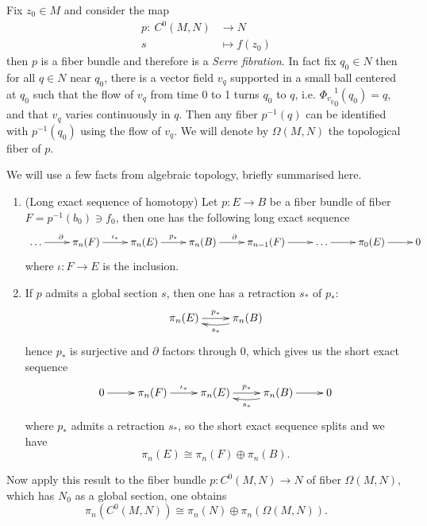 Fix \(z_0\in M\) and consider the map 
\begin{align*}
  p: \ C^0(M,N) &\longrightarrow N\\
       s	&\longmapsto	 f(z_0)
\end{align*}
then \(p\) is a fiber bundle and therefore is a \emph{Serre fibration}. In fact fix \(q_0\in N\) then for all \(q\in N\) near \(q_0\), there is a vector field \(v_q\) supported
in a small ball centered at \(q_0\) such that the flow of \(v_q\) from time 0 to 1
turns \(q_0\) to \(q\), i.e. \({\Phi_{v_q}}_0^1(q_0)=q\), and that \(v_q\) varies continuously
in \(q\). Then any fiber \(p^{-1}(q)\) can be identified with \(p^{-1}(q_0)\) using
the flow of \(v_q\). We will denote by \(\Omega(M,N)\) the topological fiber of \(p\).


We will use a few facts from algebraic topology, briefly summarised here.

\begin{fact}
\label{fact:alg-top-Omega-M-N}
\begin{enumerate}
\item (Long exact sequence of homotopy) Let \(p: E \longrightarrow B\) be a fiber bundle
of fiber \(F = p^{-1}(b_0) \ni f_0\), then one has the following long exact sequence
\[
    \xymatrix{
    \dots \ar@{->}[r]^{\partial} & \pi_n(F) \ar@{->}[r]^{\iota_*} & \pi_n(E) \ar@{->}[r]^{p_*} & \pi_n(B) \ar@{->}[r]^{\partial} & \pi_{n-1}(F) \ar@{->}[r] & \dots \ar@{->}[r] & \pi_0(E) \ar@{->}[r] & 0
    }
   \]
 where \(\iota: F \longrightarrow E\) is the inclusion.
\item If \(p\) admits a global section \(s\), then one has a retraction \(s_*\) of \(p_*\):
\[
    \xymatrix{
    \pi_n(E) \ar@{->}[r]^{p_*} & \pi_n(B) \ar@/^/@{->}[l]^{s_*}
    }
   \]
hence \(p_*\) is surjective and \(\partial\) factors through \(0\), which gives
us the short exact sequence
\[
    \xymatrix{
    0 \ar@{->}[r] & \pi_n(F) \ar@{->}[r]^{\iota_*} & \pi_n(E) \ar@{->}[r]^{p_*} & \pi_n(B) \ar@/^/@{->}[l]^{s_*} \ar@{->}[r] & 0
    }
   \]
where \(p_*\) admits a retraction \(s_*\), so the short exact sequence splits and
we have
\[
   \pi_n(E) \cong \pi_n(F) \oplus \pi_n(B).
   \]
\end{enumerate}
\end{fact}

Now apply this result to the fiber bundle \(p: C^0(M,N)
\longrightarrow N\) of fiber \(\Omega(M,N)\), which has \(N_0\) as a global section,
one obtains
\[
 \pi_n(C^0(M,N)) \cong \pi_n(N) \oplus \pi_n(\Omega(M,N)).
\]


